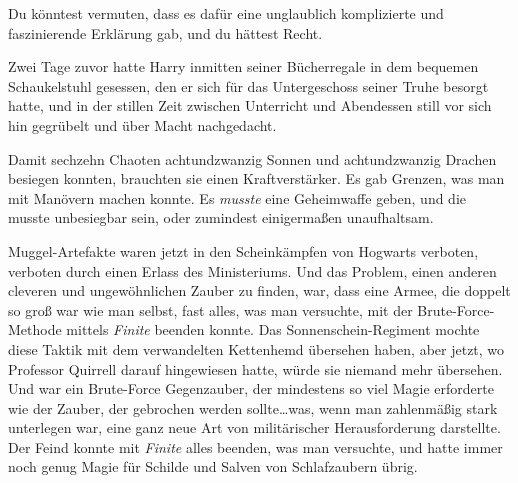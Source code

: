 Du könntest vermuten, dass es dafür eine unglaublich komplizierte und faszinierende Erklärung gab, und du hättest Recht.

Zwei Tage zuvor hatte Harry inmitten seiner Bücherregale in dem bequemen Schaukelstuhl gesessen, den er sich für das Untergeschoss seiner Truhe besorgt hatte, und in der stillen Zeit zwischen Unterricht und Abendessen still vor sich hin gegrübelt und über Macht nachgedacht.

Damit sechzehn Chaoten achtundzwanzig Sonnen und achtundzwanzig Drachen besiegen konnten, brauchten sie einen Kraftverstärker. Es gab Grenzen, was man mit Manövern machen konnte. Es \emph{musste} eine Geheimwaffe geben, und die musste unbesiegbar sein, oder zumindest einigermaßen unaufhaltsam.

Muggel-Artefakte waren jetzt in den Scheinkämpfen von Hogwarts verboten, verboten durch einen Erlass des Ministeriums. Und das Problem, einen anderen cleveren und ungewöhnlichen Zauber zu finden, war, dass eine Armee, die doppelt so groß war wie man selbst, fast alles, was man versuchte, mit der Brute-Force-Methode mittels \emph{Finite} beenden konnte. Das Sonnenschein-Regiment mochte diese Taktik mit dem verwandelten Kettenhemd übersehen haben, aber jetzt, wo Professor Quirrell darauf hingewiesen hatte, würde sie niemand mehr übersehen. Und  war ein Brute-Force Gegenzauber, der mindestens so viel Magie erforderte wie der Zauber, der gebrochen werden sollte…was, wenn man zahlenmäßig stark unterlegen war, eine ganz neue Art von militärischer Herausforderung darstellte. Der Feind konnte mit \emph{Finite} alles beenden, was man versuchte, und hatte immer noch genug Magie für Schilde und Salven von Schlafzaubern übrig.


